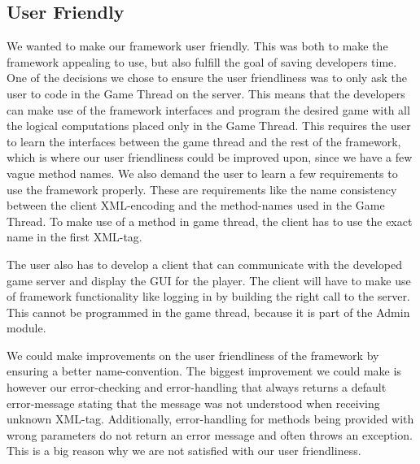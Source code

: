 \subsection{User Friendly}
We wanted to make our framework user friendly. This was both to make the framework appealing to use, but also fulfill the goal of saving developers time. One of the decisions we chose to ensure the user friendliness was to only ask the user to code in the Game Thread on the server. This means that the developers can make use of the framework interfaces and program the desired game with all the logical computations placed only in the Game Thread. This requires the user to learn the interfaces between the game thread and the rest of the framework, which is where our user friendliness could be improved upon, since we have a few vague method names. We also demand the user to learn a few requirements to use the framework properly. These are requirements like the name consistency between the client XML-encoding and the method-names used in the Game Thread. To make use of a method in game thread, the client has to use the exact name in the first XML-tag. 

The user also has to develop a client that can communicate with the developed game server and display the GUI for the player. The client will have to make use of framework functionality like logging in by building the right call to the server. This cannot be programmed in the game thread, because it is part of the Admin module.  

We could make improvements on the user friendliness of the framework by ensuring a better name-convention. The biggest improvement we could make is however our error-checking and error-handling that always returns a default error-message stating that the message was not understood when receiving unknown XML-tag. Additionally, error-handling for methods being provided with wrong parameters do not return an error message and often throws an exception. This is a big reason why we are not satisfied with our user friendliness.